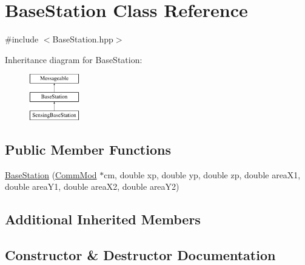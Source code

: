 \hypertarget{class_base_station}{}\section{Base\+Station Class Reference}
\label{class_base_station}


{\ttfamily \#include $<$Base\+Station.\+hpp$>$}

Inheritance diagram for Base\+Station\+:\begin{figure}[H]
\begin{center}
\leavevmode
\includegraphics[height=2.000000cm]{class_base_station}
\end{center}
\end{figure}
\subsection*{Public Member Functions}
\begin{DoxyCompactItemize}
\item 
\hyperlink{class_base_station_a21d3ef514b4ba58055a6d4bfd035ae68}{Base\+Station} (\hyperlink{class_comm_mod}{Comm\+Mod} $\ast$cm, double xp, double yp, double zp, double area\+X1, double area\+Y1, double area\+X2, double area\+Y2)
\end{DoxyCompactItemize}
\subsection*{Additional Inherited Members}


\subsection{Constructor \& Destructor Documentation}
